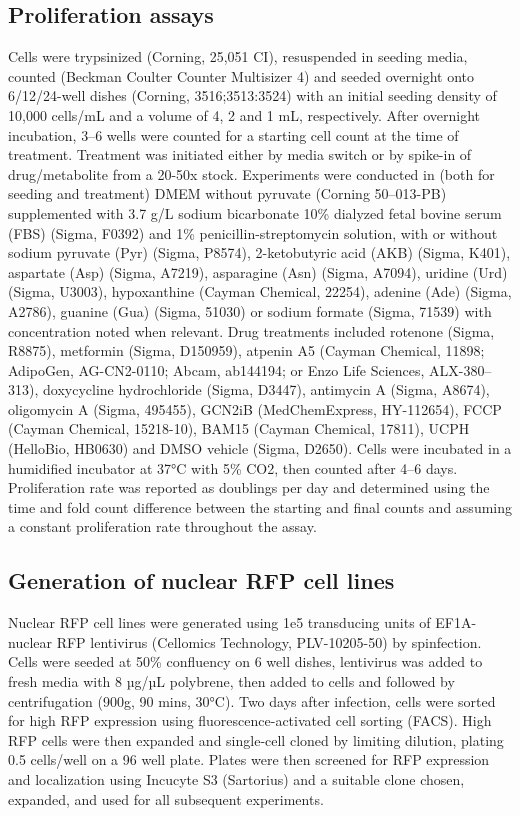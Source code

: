 \subsection{Proliferation assays}
Cells were trypsinized (Corning, 25,051 CI), resuspended in seeding media, counted (Beckman Coulter Counter Multisizer 4) and seeded overnight onto 6/12/24-well dishes (Corning, 3516;3513:3524) with an initial seeding density of 10,000 cells/mL and a volume of 4, 2 and 1 mL, respectively.
After overnight incubation, 3–6 wells were counted for a starting cell count at the time of treatment.
Treatment was initiated either by media switch or by spike-in of drug/metabolite from a 20-50x stock.
Experiments were conducted in (both for seeding and treatment) DMEM without pyruvate (Corning 50–013-PB) supplemented with 3.7 g/L sodium bicarbonate 10\% dialyzed fetal bovine serum (FBS) (Sigma, F0392) and 1\% penicillin-streptomycin solution, with or without sodium pyruvate (Pyr) (Sigma, P8574),
2-ketobutyric acid (AKB) (Sigma, K401),
aspartate (Asp) (Sigma, A7219),
asparagine (Asn) (Sigma, A7094),
uridine (Urd) (Sigma, U3003), hypoxanthine (Cayman Chemical, 22254),
adenine (Ade) (Sigma, A2786),
guanine (Gua) (Sigma, 51030) or sodium formate (Sigma, 71539) with concentration noted when relevant.
Drug treatments included rotenone (Sigma, R8875),
metformin (Sigma, D150959),
atpenin A5 (Cayman Chemical, 11898; AdipoGen, AG-CN2-0110; Abcam, ab144194; or Enzo Life Sciences, ALX-380–313),
doxycycline hydrochloride (Sigma, D3447),
antimycin A (Sigma, A8674),
oligomycin A (Sigma, 495455),
GCN2iB (MedChemExpress, HY-112654),
FCCP (Cayman Chemical, 15218-10),
BAM15 (Cayman Chemical, 17811),
UCPH (HelloBio, HB0630) and DMSO vehicle (Sigma, D2650).
Cells were incubated in a humidified incubator at 37°C with 5\% CO2, then counted after 4–6 days.
Proliferation rate was reported as doublings per day and determined using the time and fold count difference between the starting and final counts and assuming a constant proliferation rate throughout the assay.


\subsection{Generation of nuclear RFP cell lines}
Nuclear RFP cell lines were generated using 1e5 transducing units of EF1A-nuclear RFP lentivirus (Cellomics Technology, PLV-10205-50) by spinfection.
Cells were seeded at 50\% confluency on 6 well dishes, lentivirus was added to fresh media with 8 µg/µL polybrene, then added to cells and followed by centrifugation (900g, 90 mins, 30°C).
Two days after infection, cells were sorted for high RFP expression using fluorescence-activated cell sorting (FACS).
High RFP cells were then expanded and single-cell cloned by limiting dilution, plating 0.5 cells/well on a 96 well plate.
Plates were then screened for RFP expression and localization using Incucyte S3 (Sartorius) and a suitable clone chosen, expanded, and used for all subsequent experiments.



